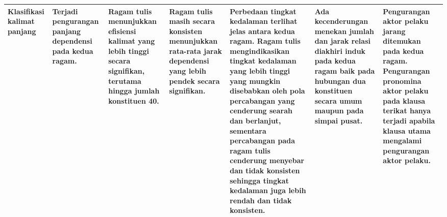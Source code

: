 \begin{landscape}
\begin{table}[htbp]
\begin{scriptsize}
\begin{center}
\begin{tabular}{| p{1.3cm} | p{2.4cm} | p{4cm} | p{3.5cm} | p{4cm} | p{3cm} | p{2.3cm} | }
Klasifikasi kalimat panjang & Terjadi pengurangan panjang dependensi pada kedua ragam. & Ragam tulis menunjukkan efisiensi kalimat yang lebih tinggi secara signifikan, terutama hingga jumlah konstituen 40. & Ragam tulis masih secara konsisten menunjukkan rata-rata jarak dependensi yang lebih pendek secara signifikan. & Perbedaan tingkat kedalaman terlihat jelas antara kedua ragam. Ragam tulis mengindikasikan tingkat kedalaman yang lebih tinggi yang mungkin disebabkan oleh pola percabangan yang cenderung searah dan berlanjut, sementara percabangan pada ragam tulis cenderung menyebar dan tidak konsisten sehingga tingkat kedalaman juga lebih rendah dan tidak konsisten. & Ada kecenderungan menekan jumlah dan jarak relasi diakhiri induk pada kedua ragam baik pada hubungan dua konstituen secara umum maupun pada simpai pusat. & Pengurangan aktor pelaku jarang ditemukan pada kedua ragam. Pengurangan pronomina aktor pelaku pada klausa terikat hanya terjadi apabila klausa utama mengalami pengurangan aktor pelaku. \\ \hline

\end{tabular}
\end{center}
\end{scriptsize}
\end{table} 
\end{landscape}


